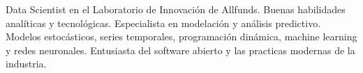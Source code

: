 

\begin{cvparagraph}

Data Scientist en el Laboratorio de Innovación de Allfunds. Buenas habilidades
analíticas y tecnológicas. Especialista en modelación y análisis predictivo.
Modelos estocásticos, series temporales, programación dinámica, machine learning
y redes neuronales. Entusiasta del software abierto y las practicas modernas de
la industria.

\end{cvparagraph}

